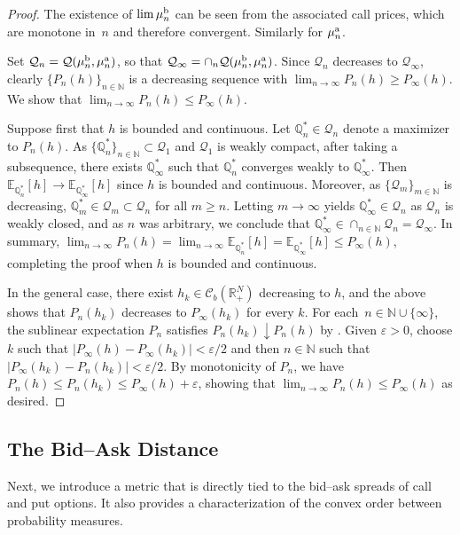 \documentclass[11pt]{article}
\newcommand{\cC}{\mathcal{C}}
\newcommand{\cQ}{\mathcal{Q}}
\newcommand{\R}{\mathbb{R}} %
\newcommand{\Q}{\mathbb{Q}} %
\newcommand{\N}{\mathbb{N}} %
\theoremstyle{plain}
\theoremstyle{definition}
\theoremstyle{remark}
\newcommand{\E}{\mathbb{E}}
\theoremstyle{plain}
\begin{document}
\begin{proof}
The existence of $\lim \mu_{n}^{\rm b}$ can be seen from the associated call prices, which are monotone in~$n$ and therefore convergent. Similarly for $\mu_{n}^{\rm a}$.

Set $\cQ_n=\cQ(\mu^{\rm b}_n, \mu^{\rm a}_n)$, so that $\cQ_\infty=\cap_n\cQ(\mu^{\rm b}_n, \mu^{\rm a}_n)$. Since $\cQ_n$ decreases to $\cQ_\infty$,  clearly $\{P_n(h)\}_{n\in \N}$ is a decreasing sequence with $\lim_{n\to \infty} P_n(h) \geq  P_\infty(h)$. We show that $\lim_{n\to \infty} P_n(h)\leq P_\infty(h)$.

Suppose first that $h$ is bounded and continuous. Let $\Q_n^* \in \cQ_n$ denote a maximizer to $P_n(h)$.  As $\{\Q_n^*\}_{n \in \N}\subset \cQ_1$ and $\cQ_1$ is weakly compact, after taking a subsequence, there exists $\Q_\infty^*$ such that $\Q_n^*$ converges weakly to $\Q_\infty^*$. Then $\E_{\Q_n^*}[h] \to \E_{\Q_\infty^*}[h]$ since $h$ is bounded and continuous. Moreover, as $\{\cQ_m\}_{m\in \N}$ is decreasing, $\Q_m^* \in \cQ_m \subset \cQ_n$ for all $m\geq n$. Letting $m\to\infty$ yields $\Q_\infty^* \in \cQ_n$ as  $\cQ_n$ is weakly closed, and as $n$ was arbitrary, we conclude that $\Q_\infty^* \in \cap_{n\in \N}\cQ_n = \cQ_\infty$. In summary, $\lim_{n\to \infty}P_n(h) = \lim_{n\to \infty}\E_{\Q_n^*}[h] = \E_{\Q_\infty^*}[h] \leq  P_\infty(h)$, completing the proof when $h$ is bounded and continuous.

In the general case, there exist $h_k \in \cC_b(\R^N_+)$ decreasing to $h$, and the above shows that $P_n(h_k)$ decreases to $P_\infty(h_k)$ for every $k$. For each~$n\in\N\cup\{\infty\}$, the sublinear expectation $P_n$ satisfies $P_n(h_k) \downarrow P_n(h)$ by \citep[Theorem~31]{DenisHuPeng2011}. %
Given $\varepsilon>0$, choose $k$ such that $|P_\infty(h)-P_\infty(h_k)|<\varepsilon/2$ and then $n\in\N$ such that $|P_\infty(h_k)-P_n(h_k)|<\varepsilon/2$. By monotonicity of $P_n$, we have $P_n(h) \leq P_n(h_k) \leq P_\infty(h) + \varepsilon$, showing that $\lim_{n\to \infty} P_n(h)\leq P_\infty(h)$ as desired.
\end{proof}

\subsection{The Bid--Ask Distance}\label{sec:bid_ask_dist}

Next, we introduce a metric that is directly tied to the bid--ask spreads of call and put options. It also provides a characterization of the convex order between probability measures.
\end{document}
